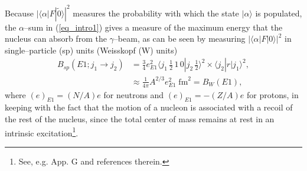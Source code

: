 Because $|\langle \alpha|F|\tilde 0\rangle|^2$ measures the probability with which the state $|\alpha\rangle$ is populated, the $\alpha$--sum in (\ref{eq_intro1}) gives a measure of the maximum energy that the nucleus can absorb from the $\gamma$--beam, as can be seen by measuring $|\langle \alpha|F|0\rangle|^2$ in single--particle (sp) units (Weisskopf (W) units)
\begin{align}\label{eq1.2.5}
\nonumber B_{sp}(E1;j_1\rightarrow j_2)&=\frac{3}{4}e^2_{E1}\langle j_1\, \tfrac{1}{2}\,1\,0|j_2\,\tfrac{1}{2}\rangle^2\times \langle j_2|r|j_1\rangle^2,\\
&\approx \frac{1}{4\pi}A^{2/3}e^2_{E1}\;\text{fm}^2=B_W(E1),
\end{align}
where $(e)_{E1}=(N/A)e$ for neutrons and  $(e)_{E1}=-(Z/A)e$ for protons, in keeping with the fact that the motion of a nucleon is associated with a recoil of the rest of the nucleus, since the total center of mass remains at rest in an intrinsic excitation\footnote{See, e.g. \cite{Broglia:16} App. G and references therein.}. 



